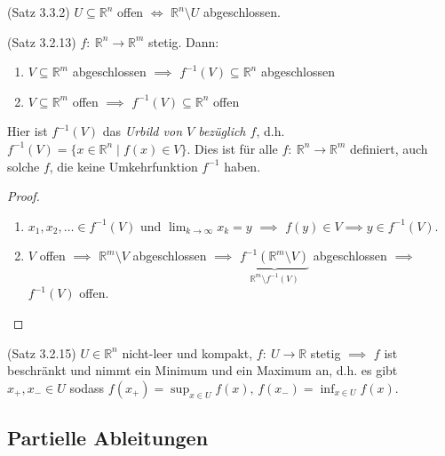 \documentclass[a4paper,10pt]{article}
\def\R{\mathbb{R}}
\begin{document}
\begin{subbox}{(Satz 3.3.2)}
    \( U \subseteq \R^n \) offen \( \iff \) \(\R^n \setminus U \) abgeschlossen.
\end{subbox}

\begin{subbox}{(Satz 3.2.13)}
    \( f: \: \R^n \to \R^m \) stetig. Dann:
    \begin{enumerate}
        \item \( V \subseteq \R^m \) abgeschlossen \( \implies \) \( f^{-1}(V) \subseteq \R^n \) abgeschlossen
        \item \( V \subseteq \R^m \) offen \( \implies \) \( f^{-1}(V) \subseteq \R^n \) offen
    \end{enumerate}
    Hier ist \( f^{-1}(V) \) das \emph{Urbild von \( V \) bezüglich \( f \)}, d.h. \( f^{-1}(V) = \{ x \in \R^n \; | \; f(x) \in V \} \). Dies ist für alle \( f: \: \R^n \to \R^m \) definiert, auch solche \( f \), die keine Umkehrfunktion \( f^{-1} \) haben.
\end{subbox}

\begin{proof}
    \begin{enumerate}
        \item \( x_1, x_2, \dots \in f^{-1}(V) \) und \( \lim_{k \to \infty} x_k = y \) \( \implies \) \( f(y) \in V \implies y \in f^{-1}(V) \).
        \item \( V \) offen \( \implies \) \( \R^m \setminus V \) abgeschlossen \( \implies \) \( \underbrace{f^{-1}(\R^m \setminus V)}_{\R^m \setminus f^{-1}(V)} \) abgeschlossen \( \implies \) \( f^{-1}(V) \) offen.
    \end{enumerate}
\end{proof}

\begin{subbox}{(Satz 3.2.15)}
    \( U \in \R^n \) nicht-leer und kompakt, \( f: \: U \to \R \) stetig \( \implies \) \( f \) ist beschränkt und nimmt ein Minimum und ein Maximum an, d.h. es gibt \( x_+, x_- \in U \) sodass \( f(x_+) = \sup_{x \in U} f(x), \, f(x_-) = \inf_{x \in U} f(x) \).
\end{subbox}


\subsection{Partielle Ableitungen}

\end{document}
